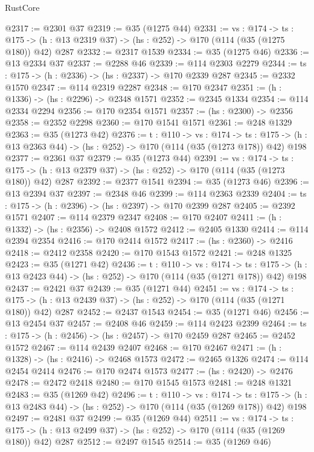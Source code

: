 \begin{lexlean}{RustCore}
\begin{coremodule}
@2317 := @2301 @37
@2319 := @35 (@1275 @44)
@2331 := {vs : @174} ->
  {ts : @175} -> (h : @13 @2319 @37) -> (hs : @252) -> @170 (@114 (@35 (@1275 @180)) @42) @287
@2332 := @2317 @1539
@2334 := @35 (@1275 @46)
@2336 := @13 @2334 @37
@2337 := @2288 @46
@2339 := @114 @2303 @2279
@2344 := {ts : @175} -> (h : @2336) -> (hs : @2337) -> @170 @2339 @287
@2345 := @2332 @1570
@2347 := @114 @2319 @2287
@2348 := @170 @2347
@2351 := (h : @1336) -> (hs : @2296) -> @2348 @1571
@2352 := @2345 @1334
@2354 := @114 @2334 @2294
@2356 := @170 @2354 @1571
@2357 := (hs : @2300) -> @2356
@2358 := @2352 @2298
@2360 := @170 @1541 @1571
@2361 := @248 @1329
@2363 := @35 (@1273 @42)
@2376 := {t : @110} ->
  {vs : @174} ->
  {ts : @175} -> (h : @13 @2363 @44) -> (hs : @252) -> @170 (@114 (@35 (@1273 @178)) @42) @198
@2377 := @2361 @37
@2379 := @35 (@1273 @44)
@2391 := {vs : @174} ->
  {ts : @175} -> (h : @13 @2379 @37) -> (hs : @252) -> @170 (@114 (@35 (@1273 @180)) @42) @287
@2392 := @2377 @1541
@2394 := @35 (@1273 @46)
@2396 := @13 @2394 @37
@2397 := @2348 @46
@2399 := @114 @2363 @2339
@2404 := {ts : @175} -> (h : @2396) -> (hs : @2397) -> @170 @2399 @287
@2405 := @2392 @1571
@2407 := @114 @2379 @2347
@2408 := @170 @2407
@2411 := (h : @1332) -> (hs : @2356) -> @2408 @1572
@2412 := @2405 @1330
@2414 := @114 @2394 @2354
@2416 := @170 @2414 @1572
@2417 := (hs : @2360) -> @2416
@2418 := @2412 @2358
@2420 := @170 @1543 @1572
@2421 := @248 @1325
@2423 := @35 (@1271 @42)
@2436 := {t : @110} ->
  {vs : @174} ->
  {ts : @175} -> (h : @13 @2423 @44) -> (hs : @252) -> @170 (@114 (@35 (@1271 @178)) @42) @198
@2437 := @2421 @37
@2439 := @35 (@1271 @44)
@2451 := {vs : @174} ->
  {ts : @175} -> (h : @13 @2439 @37) -> (hs : @252) -> @170 (@114 (@35 (@1271 @180)) @42) @287
@2452 := @2437 @1543
@2454 := @35 (@1271 @46)
@2456 := @13 @2454 @37
@2457 := @2408 @46
@2459 := @114 @2423 @2399
@2464 := {ts : @175} -> (h : @2456) -> (hs : @2457) -> @170 @2459 @287
@2465 := @2452 @1572
@2467 := @114 @2439 @2407
@2468 := @170 @2467
@2471 := (h : @1328) -> (hs : @2416) -> @2468 @1573
@2472 := @2465 @1326
@2474 := @114 @2454 @2414
@2476 := @170 @2474 @1573
@2477 := (hs : @2420) -> @2476
@2478 := @2472 @2418
@2480 := @170 @1545 @1573
@2481 := @248 @1321
@2483 := @35 (@1269 @42)
@2496 := {t : @110} ->
  {vs : @174} ->
  {ts : @175} -> (h : @13 @2483 @44) -> (hs : @252) -> @170 (@114 (@35 (@1269 @178)) @42) @198
@2497 := @2481 @37
@2499 := @35 (@1269 @44)
@2511 := {vs : @174} ->
  {ts : @175} -> (h : @13 @2499 @37) -> (hs : @252) -> @170 (@114 (@35 (@1269 @180)) @42) @287
@2512 := @2497 @1545
@2514 := @35 (@1269 @46)

\end{coremodule}
\end{lexlean}
